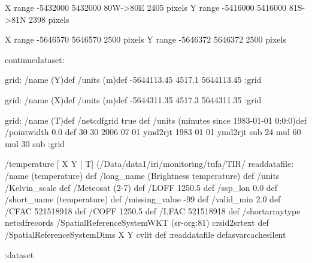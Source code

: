 X range -5432000 5432000  80W->80E 2405 pixels
Y range -5416000 5416000  81S->81N 2398 pixels

X range -5646570 5646570 2500 pixels
Y range -5646372 5646372 2500 pixels

\begin{ingrid}
continuedataset:

grid:
/name (Y)def
/units (m)def
-5644113.45 4517.1 5644113.45
:grid

grid:
/name (X)def
/units (m)def
-5644311.35 4517.3 5644311.35
:grid

grid:
/name (T)def
/netcdfgrid true def
/units (minutes since 1983-01-01 0:0:0)def
/pointwidth 0.0 def
30
30
2006 07 01 ymd2rjt 1983 01 01 ymd2rjt sub 24 mul 60 mul 30 sub
:grid

/temperature{
[ X Y | T] (/Data/data1/iri/monitoring/tufa/TIR/%
readdatafile:
/name (temperature) def
/long_name (Brightness temperature) def
/units /Kelvin_scale def
/Meteosat (2-7) def
/LOFF 1250.5 def
/ssp_lon 0.0 def
/short_name (temperature) def
/missing_value -99 def
/valid_min 2.0 def
/CFAC 521518918 def
/COFF 1250.5 def
/LFAC 521518918 def
/shortarraytype netcdfrecords
/SpatialReferenceSystemWKT (sr-org:81) crsid2srtext def
/SpatialReferenceSystemDims { X Y } cvlit  def
:readdatafile
}defasvarcachesilent

:dataset

\end{ingrid}
